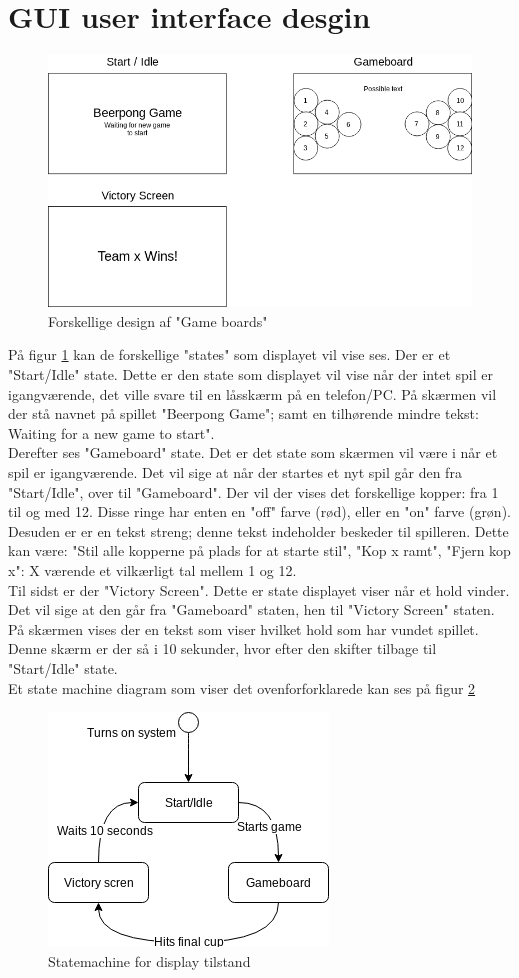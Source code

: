 \documentclass[Softwaredesign/Softwaredesign_main.tex]{subfiles}
\begin{document}
\section{GUI user interface desgin}
\begin{figure}[H]
    \centering
    \includegraphics[scale=0.5]{Softwaredesign/GUI/Pictures/Boards.png}
    \caption{Forskellige design af "Game boards"}
    \label{gameboards}
\end{figure}

På figur \ref{gameboards} kan de forskellige "states" som displayet vil vise ses. Der er et "Start/Idle" state. Dette er den state som displayet vil vise når der intet spil er igangværende, det ville svare til en låsskærm på en telefon/PC. På skærmen vil der stå navnet på spillet "Beerpong Game"; samt en tilhørende mindre tekst: Waiting for a new game to start". 
\\Derefter ses "Gameboard" state. Det er det state som skærmen vil være i når et spil er igangværende. Det vil sige at når der startes et nyt spil går den fra "Start/Idle", over til "Gameboard". Der vil der vises det forskellige kopper: fra 1 til og med 12. Disse ringe har enten en "off" farve (rød), eller en "on" farve (grøn). Desuden er er en tekst streng; denne tekst indeholder beskeder til spilleren. Dette kan være: "Stil alle kopperne på plads for at starte stil", "Kop x ramt", "Fjern kop x": X værende et vilkærligt tal mellem 1 og 12. 
\\ 
Til sidst er der "Victory Screen". Dette er state displayet viser når et hold vinder. Det vil sige at den går fra "Gameboard" staten, hen til "Victory Screen" staten. På skærmen vises der en tekst som viser hvilket hold som har vundet spillet. Denne skærm er der så i 10 sekunder, hvor efter den skifter tilbage til "Start/Idle" state.  
\\
Et state machine diagram som viser det ovenforforklarede kan ses på figur \ref{GuiDisplayStatemachine}

\begin{figure}[H]
    \centering
    \includegraphics{Softwaredesign/GUI/Pictures/GuiDisplayStatemachine.png}
    \caption{Statemachine for display tilstand}
    \label{GuiDisplayStatemachine}
\end{figure}
\end{document}
